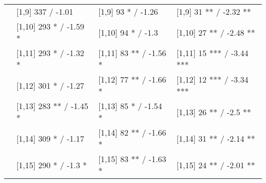 \begin{table}
\begin{tabular}[t]{llll}
 & {}[1,9] 337  / -1.01 & {}[1,9] 93 * / -1.26 & {}[1,9] 31 ** / -2.32 **\\
 & {}[1,10] 293 * / -1.59 * & {}[1,10] 94 * / -1.3 & {}[1,10] 27 ** / -2.48 **\\
 & {}[1,11] 293 * / -1.32 * & {}[1,11] 83 ** / -1.56 * & {}[1,11] 15 *** / -3.44 ***\\
 & {}[1,12] 301 * / -1.27 & {}[1,12] 77 ** / -1.66 * & {}[1,12] 12 *** / -3.34 ***\\
\addlinespace
 & {}[1,13] 283 ** / -1.45 * & {}[1,13] 85 * / -1.54 * & {}[1,13] 26 ** / -2.5 **\\
 & {}[1,14] 309 * / -1.17 & {}[1,14] 82 ** / -1.66 * & {}[1,14] 31 ** / -2.14 **\\
 & {}[1,15] 290 * / -1.3 * & {}[1,15] 83 ** / -1.63 * & {}[1,15] 24 ** / -2.01 **\\
\bottomrule
\end{tabular}
\end{table}
